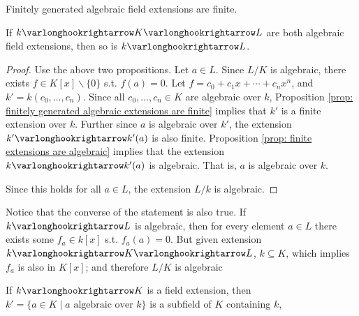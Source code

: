 \documentclass{article}
\begin{document}
\begin{corollary}
    Finitely generated algebraic field extensions are finite.
\end{corollary}

\begin{proposition}\label{prop: transitivity of algebraic extensions}
    If $k \ext K \ext L$ are both algebraic field extensions, then so is $k \ext L$.
\end{proposition}

\begin{proof}
    Use the above two propositions. Let $a \in L$. Since $L/K$ is algebraic, there exists $f \in K[x] \smallsetminus \{0\}$ s.t. $f(a) = 0$. Let $f = c_0 + c_1 x + \cdots + c_n x^n$, and $k' = k(c_0, \dots, c_n)$. Since all $c_0, \dots, c_n \in K$ are algebraic over $k$, Proposition \ref{prop: finitely generated algebraic extensions are finite} implies that $k'$ is a finite extension over $k$. Further since $a$ is algebraic over $k'$, the extension $k' \ext k'(a)$ is also finite. Proposition \ref{prop: finite extensions are algebraic} implies that the extension $k \ext k'(a)$ is algebraic. That is, $a$ is algebraic over $k$.

    Since this holds for all $a \in L$, the extension $L/k$ is algebraic.
\end{proof}

\begin{remark}\label{rmk: subextension of algebraic extension is algebraic}
    Notice that the converse of the statement is also true. If $k \ext L$ is algebraic, then for every element $a \in L$ there exists some $f_a \in k[x]$ s.t. $f_a(a) = 0$. But given extension $k \ext K \ext L$, $k \subseteq K$, which implies $f_a$ is also in $K[x]$; and therefore $L/K$ is algebraic
\end{remark}

\begin{proposition}\label{prop: algebraic closure is a field}
    If $k \ext K$ is a field extension, then $k' = \{a \in K \mid \text{$a$ algebraic over $k$}\}$ is a subfield of $K$ containing $k$,
\end{proposition}
\end{document}
